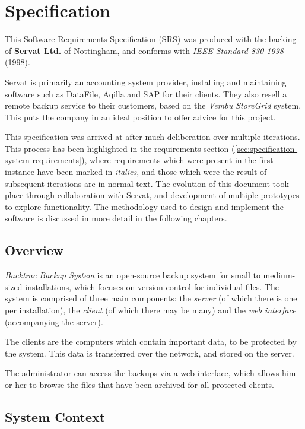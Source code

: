 \chapter{Specification}
\label{chap:specification}

This Software Requirements Specification (SRS) was produced with the backing of
\textbf{Servat Ltd.} of Nottingham, and conforms with \emph{IEEE Standard
830-1998} (1998).

Servat is primarily an accounting system provider, installing and maintaining
software such as DataFile, Aqilla and SAP for their clients. They also resell
a remote backup service to their customers, based on the \emph{Vembu StoreGrid}
system. This puts the company in an ideal position to offer advice for this
project.

This specification was arrived at after much deliberation over multiple
iterations. This process has been highlighted in the requirements section
(\ref{sec:specification-system-requirements}), where requirements which were
present in the first instance have been marked in \emph{italics}, and those
which were the result of subsequent iterations are in normal text. The
evolution of this document took place through collaboration with Servat, and
development of multiple prototypes to explore functionality. The methodology
used to design and implement the software is discussed in more detail in the
following chapters.

\section{Overview}

\emph{Backtrac Backup System} is an open-source backup system for small to
medium-sized installations, which focuses on version control for individual
files. The system is comprised of three main components: the \emph{server} (of
which there is one per installation), the \emph{client} (of which there may be
many) and the \emph{web interface} (accompanying the server).

The clients are the computers which contain important data, to be protected by
the system. This data is transferred over the network, and stored on the
server.

The administrator can access the backups via a web interface, which allows him
or her to browse the files that have been archived for all protected clients.

\section{System Context}

